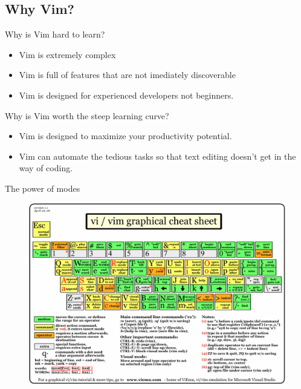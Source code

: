 \documentclass{beamer}
\begin{document}
    \subsection{Why Vim?}
    \begin{frame}{Why is Vim hard to learn?}
        \begin{itemize}
            \item Vim is extremely complex %
            \item Vim is full of features that are not imediately discoverable
            \item Vim is designed for experienced developers not beginners.
        \end{itemize}
    \end{frame}
    \begin{frame}{Why is Vim worth the steep learning curve?}
        \begin{itemize}
            \item Vim is designed to maximize your productivity potential.
            \item Vim can automate the tedious tasks so that text editing doesn't get in the way of coding.
        \end{itemize}
    \end{frame}
    \begin{frame}{The power of modes}
        \begin{figure}
            \centering
            \includegraphics[width=0.8\linewidth]{vi-vim-cheat-sheet.jpg}
        \end{figure}
    \end{frame}
\end{document}
